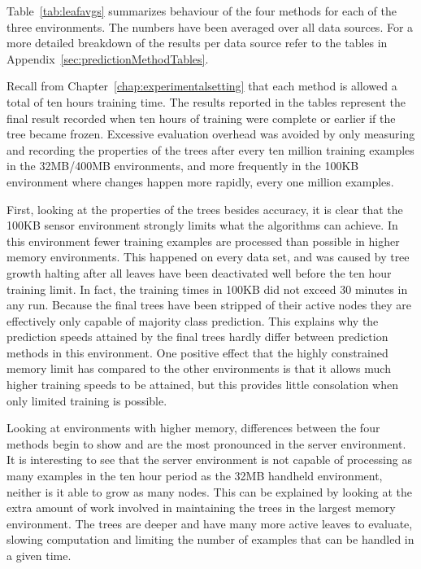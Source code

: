 Table~\ref{tab:leafavgs} summarizes behaviour of the four methods for each of the three environments. The numbers have been averaged over all data sources. For a more detailed breakdown of the results per data source refer to the tables in Appendix~\ref{sec:predictionMethodTables}.

Recall from Chapter~\ref{chap:experimentalsetting} that each method is allowed a total of ten hours training time. The results reported in the tables represent the final result recorded when ten hours of training were complete or earlier if the tree became frozen. Excessive evaluation overhead was avoided by only measuring and recording the properties of the trees after every ten million training examples in the 32MB/400MB environments, and more frequently in the 100KB environment where changes happen more rapidly, every one million examples.

First, looking at the properties of the trees besides accuracy, it is clear that the 100KB sensor environment strongly limits what the algorithms can achieve.
In this environment fewer training examples are processed than possible in higher memory environments.
This happened on every data set, and was caused by tree growth halting after all leaves have been deactivated well before the ten hour training limit.
In fact, the training times in 100KB did not exceed 30 minutes in any run.
Because the final trees have been stripped of their active nodes they are effectively only capable of majority class prediction. This explains why the prediction speeds attained by the final trees hardly differ between prediction methods in this environment. One positive effect that the highly constrained memory limit has compared to the other environments is that it allows much higher training speeds to be attained, but this provides little consolation when only limited training is possible.

Looking at environments with higher memory, differences between the four methods begin to show and are the most pronounced in the server environment. It is interesting to see that the server environment is not capable of processing as many examples in the ten hour period as the 32MB handheld environment, neither is it able to grow as many nodes. This can be explained by looking at the extra amount of work involved in maintaining the trees in the largest memory environment. The trees are deeper and have many more active leaves to evaluate, slowing computation and limiting the number of examples that can be handled in a given time.

